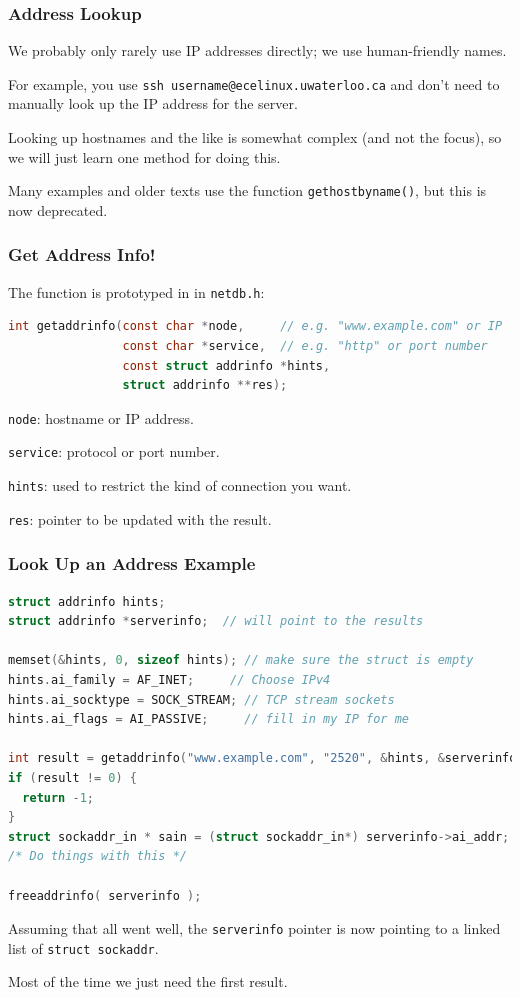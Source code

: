 \begin{frame}
\frametitle{Address Lookup}

We probably only rarely use IP addresses directly; we use human-friendly names.

For example, you use \texttt{ssh username@ecelinux.uwaterloo.ca} and don't need to manually look up the IP address for the server.

Looking up hostnames and the like is somewhat complex (and not the focus), so we will just learn one method for doing this.

Many examples and older texts use the function \texttt{gethostbyname()}, but this is now deprecated.

\end{frame}


\begin{frame}[fragile]
\frametitle{Get Address Info!}

The function is prototyped in in \texttt{netdb.h}:

\begin{lstlisting}[language=C]
int getaddrinfo(const char *node,     // e.g. "www.example.com" or IP
                const char *service,  // e.g. "http" or port number
                const struct addrinfo *hints,
                struct addrinfo **res);
\end{lstlisting}

\texttt{node}: hostname or IP address.

\texttt{service}: protocol or port number.

\texttt{hints}: used to restrict the kind of connection you want.

\texttt{res}: pointer to be updated with the result.

\end{frame}


\begin{frame}[fragile]
\frametitle{Look Up an Address Example}

\begin{lstlisting}[language=C]
struct addrinfo hints;
struct addrinfo *serverinfo;  // will point to the results

memset(&hints, 0, sizeof hints); // make sure the struct is empty
hints.ai_family = AF_INET;     // Choose IPv4
hints.ai_socktype = SOCK_STREAM; // TCP stream sockets
hints.ai_flags = AI_PASSIVE;     // fill in my IP for me

int result = getaddrinfo("www.example.com", "2520", &hints, &serverinfo);
if (result != 0) {
  return -1;
}
struct sockaddr_in * sain = (struct sockaddr_in*) serverinfo->ai_addr;
/* Do things with this */

freeaddrinfo( serverinfo );
\end{lstlisting}


Assuming that all went well, the \texttt{serverinfo} pointer is now pointing to a linked list of \texttt{struct sockaddr}.

Most of the time we just need the first result.
\end{frame}



